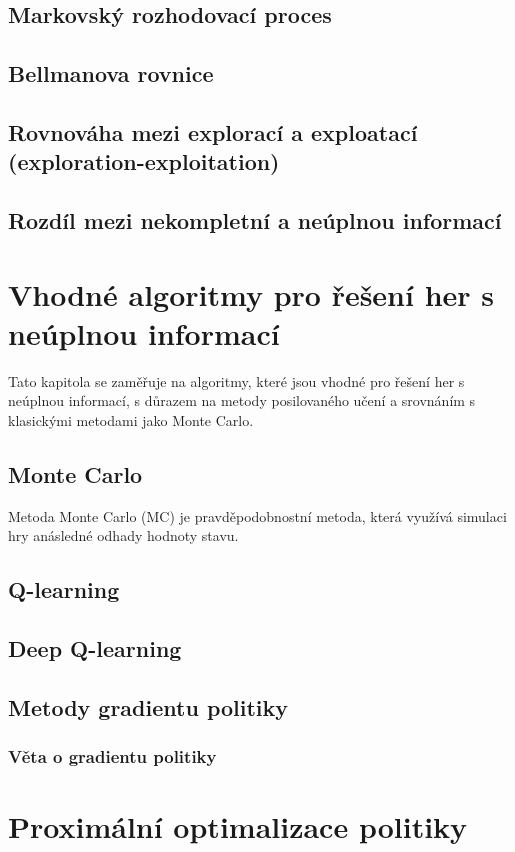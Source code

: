 \subsection{Markovský rozhodovací proces}
\subsection{Bellmanova rovnice}
\subsection{Rovnováha mezi explorací a exploatací (exploration-exploitation)}


\subsection*{Rozdíl mezi nekompletní a neúplnou informací}


\section{Vhodné algoritmy pro řešení her s neúplnou informací}

Tato kapitola se zaměřuje na algoritmy, které jsou vhodné pro řešení her s neúplnou informací, s důrazem na metody posilovaného učení a srovnáním s klasickými metodami jako Monte Carlo.

\subsection*{Monte Carlo}
Metoda Monte Carlo (MC) je pravděpodobnostní metoda, která využívá simulaci hry anásledné odhady hodnoty stavu.

\subsection*{Q-learning}
\subsection*{Deep Q-learning}
\subsection*{Metody gradientu politiky}
\subsubsection*{Věta o gradientu politiky}
\section{Proximální optimalizace politiky}
\label{sec:proximalni-optimalizace-politiky}


